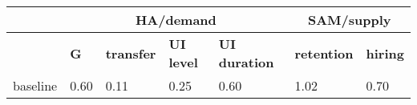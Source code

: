 \begin{tabular}{lllllll}
\multicolumn{1}{c}{}& \multicolumn{4}{c}{\textbf{HA/demand}} & \multicolumn{2}{c}{\textbf{SAM/supply}}\\
\toprule
 & \textbf{G} & \textbf{transfer}  & \textbf{UI level} & \textbf{UI duration} & \textbf{retention} & \textbf{hiring}\\
\midrule
baseline & 0.60 & 0.11  & 0.25 & 0.60 & 1.02 & 0.70\\
\bottomrule
\end{tabular}
